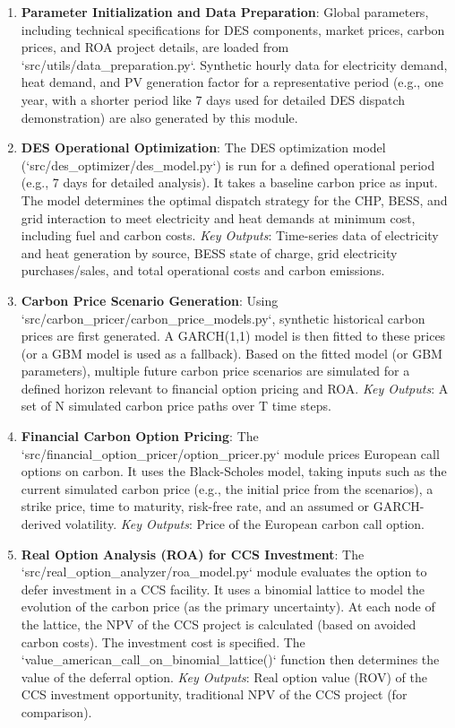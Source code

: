 \begin{enumerate}
    \item \textbf{Parameter Initialization and Data Preparation}: Global parameters, including technical specifications for DES components, market prices, carbon prices, and ROA project details, are loaded from `src/utils/data_preparation.py`. Synthetic hourly data for electricity demand, heat demand, and PV generation factor for a representative period (e.g., one year, with a shorter period like 7 days used for detailed DES dispatch demonstration) are also generated by this module.
    
    \item \textbf{DES Operational Optimization}: 
    The DES optimization model (`src/des_optimizer/des_model.py`) is run for a defined operational period (e.g., 7 days for detailed analysis). It takes a baseline carbon price as input. The model determines the optimal dispatch strategy for the CHP, BESS, and grid interaction to meet electricity and heat demands at minimum cost, including fuel and carbon costs.
    \textit{Key Outputs}: Time-series data of electricity and heat generation by source, BESS state of charge, grid electricity purchases/sales, and total operational costs and carbon emissions.
    
    \item \textbf{Carbon Price Scenario Generation}:
    Using `src/carbon_pricer/carbon_price_models.py`, synthetic historical carbon prices are first generated. A GARCH(1,1) model is then fitted to these prices (or a GBM model is used as a fallback). Based on the fitted model (or GBM parameters), multiple future carbon price scenarios are simulated for a defined horizon relevant to financial option pricing and ROA.
    \textit{Key Outputs}: A set of N simulated carbon price paths over T time steps.
    
    \item \textbf{Financial Carbon Option Pricing}:
    The `src/financial_option_pricer/option_pricer.py` module prices European call options on carbon. It uses the Black-Scholes model, taking inputs such as the current simulated carbon price (e.g., the initial price from the scenarios), a strike price, time to maturity, risk-free rate, and an assumed or GARCH-derived volatility.
    \textit{Key Outputs}: Price of the European carbon call option.
    
    \item \textbf{Real Option Analysis (ROA) for CCS Investment}:
    The `src/real_option_analyzer/roa_model.py` module evaluates the option to defer investment in a CCS facility. It uses a binomial lattice to model the evolution of the carbon price (as the primary uncertainty). At each node of the lattice, the NPV of the CCS project is calculated (based on avoided carbon costs). The investment cost is specified. The `value_american_call_on_binomial_lattice()` function then determines the value of the deferral option.
    \textit{Key Outputs}: Real option value (ROV) of the CCS investment opportunity, traditional NPV of the CCS project (for comparison).
    

\end{enumerate}
